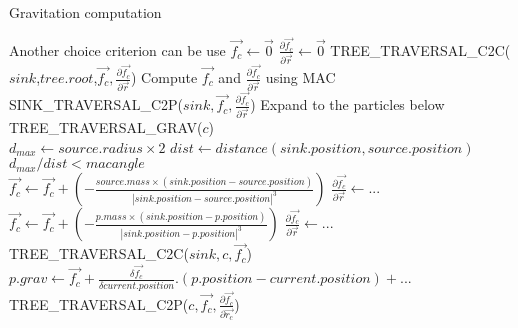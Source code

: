 \documentclass[notes.tex]{subfiles}
\begin{document}
\begin{algorithm}
\caption{Gravitation computation}\label{comp_grav}
\begin{algorithmic}[1]
\Comment Another choice criterion can be use
	\State $\vec{f_c} \leftarrow \vec{0}$
	\State $\frac{\partial \vec{f_c}}{\partial \vec{r}} \leftarrow \vec{0}$
	\State TREE\_TRAVERSAL\_C2C($sink$,$tree.root$,$\vec{f_c},\frac{\partial \vec{f_c}}{\partial \vec{r}}$)
	\Comment Compute $\vec{f_c}$ and $\frac{\partial \vec{f_c}}{\partial \vec{r}}$ using MAC
	\State SINK\_TRAVERSAL\_C2P($sink,\vec{f_c},\frac{\partial \vec{f_c}}{\partial \vec{r}}$)
	\Comment Expand to the particles below
\Else
{}
	\State TREE\_TRAVERSAL\_GRAV($c$)
\EndFor
\EndIf
\EndProcedure
\\
\State $d_{max} \leftarrow source.radius\times 2 $
\State $dist \leftarrow distance(sink.position,source.position)$
\State \Return $d_{max}/dist < macangle$
\EndFunction
\\
	\State $\vec{f_c} \leftarrow \vec{f_c} + (- \frac{source.mass\times (sink.position - source.position) }{ |sink.position - source.position|^3} )$
	\State $ \frac{\partial \vec{f_c}}{\partial \vec{r}} \leftarrow ... $
\Else
{}
	\State $\vec{f_c} \leftarrow \vec{f_c} + (- \frac{p.mass\times (sink.position - p.position) }{ |sink.position - p.position|^3} )$
	\State $ \frac{\partial \vec{f_c}}{\partial \vec{r}} \leftarrow ... $
\EndFor
\Else
	\State TREE\_TRAVERSAL\_C2C($sink,c,\vec{f_c}$)
\EndFor
\EndIf
\EndIf
\EndProcedure
\\
		\State $p.grav \leftarrow \vec{f_c}+\frac{\delta \vec{f_c}}{\delta current.position}.(p.position-current.position) + ...$
	\EndFor
\Else
		\State TREE\_TRAVERSAL\_C2P($ c, \vec{f_c}, \frac{\partial \vec{f_c}}{\partial \vec{r_c}}$)
	\EndFor
\EndIf
\EndProcedure
\end{algorithmic}
\end{algorithm}
\end{document}
